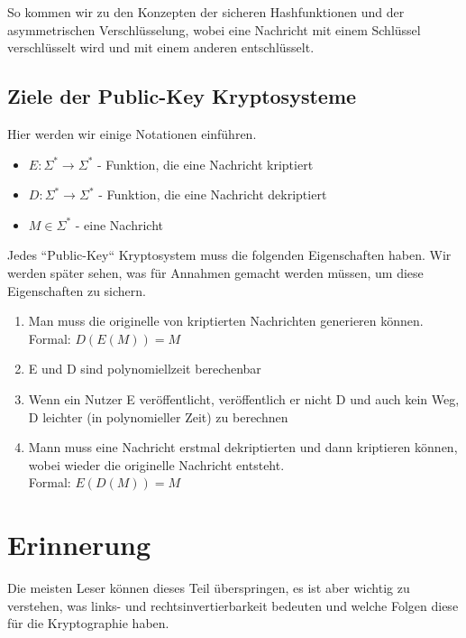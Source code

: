 \documentclass[12pt,a4paper]{article}
\theoremstyle{definition}
\begin{document}
    So kommen wir zu den Konzepten der sicheren Hashfunktionen und der asymmetrischen Verschlüsselung,
    wobei eine Nachricht mit einem Schlüssel verschlüsselt wird und mit einem anderen entschlüsselt.

    \subsection{Ziele der Public-Key Kryptosysteme}
    Hier werden wir einige Notationen einführen.

    \begin{itemize}
        \item $E: \Sigma^* \longrightarrow \Sigma^*$ - Funktion, die eine Nachricht kriptiert
        \item $D: \Sigma^* \longrightarrow \Sigma^*$ - Funktion, die eine Nachricht dekriptiert
        \item $M \in \Sigma^*$ - eine Nachricht
    \end{itemize}

    Jedes ``Public-Key`` Kryptosystem muss die folgenden Eigenschaften haben. Wir werden später sehen, was für
    Annahmen gemacht werden müssen, um diese Eigenschaften zu sichern.

    \begin{enumerate}
        \item Man muss die originelle von kriptierten Nachrichten generieren können. \\
        Formal: $D(E(M)) = M$
        \item E und D sind polynomiellzeit berechenbar
        \item Wenn ein Nutzer E veröffentlicht, veröffentlich er nicht D und auch kein Weg, D leichter (in polynomieller
        Zeit) zu berechnen
        \item Mann muss eine Nachricht erstmal dekriptierten und dann kriptieren können, wobei wieder die originelle
        Nachricht entsteht. \\
        Formal: $E(D(M)) = M$
    \end{enumerate}

    \section{Erinnerung}

    Die meisten Leser können dieses Teil überspringen, es ist aber wichtig zu verstehen, was links- und
    rechtsinvertierbarkeit bedeuten und welche Folgen diese für die Kryptographie haben.
\end{document}
